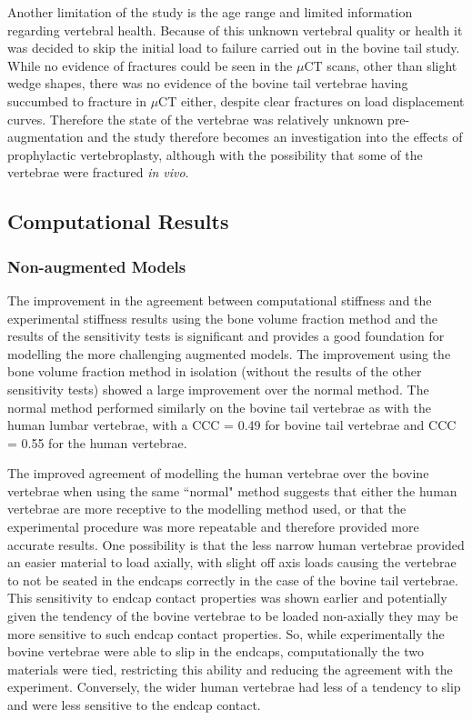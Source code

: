 Another limitation of the study is the age range and limited information
regarding vertebral health.  Because of this unknown vertebral quality or
health it was decided to skip the initial load to failure carried out in the
bovine tail study.  While no evidence of fractures could be seen in the $\mu$CT
scans, other than slight wedge shapes, there was no evidence of the bovine tail
vertebrae having succumbed to fracture in $\mu$CT either, despite clear
fractures on load displacement curves.  Therefore the state of the vertebrae
was relatively unknown pre-augmentation and the study therefore becomes an
investigation into the effects of prophylactic vertebroplasty, although with
the possibility that some of the vertebrae were fractured \textit{in vivo}.




\subsection{Computational Results}

\subsubsection{Non-augmented Models}

The improvement in the agreement between computational stiffness and the
experimental stiffness results using the bone volume fraction method and the
results of the sensitivity tests is significant and provides a good foundation
for modelling the more challenging augmented models. The improvement using the
bone volume fraction method in isolation (without the results of the other
sensitivity tests) showed a large improvement over the normal method.  The
normal method performed similarly on the bovine tail vertebrae as with the
human lumbar vertebrae, with a CCC = 0.49 for bovine tail vertebrae and CCC =
0.55 for the human vertebrae. 

The improved agreement of modelling the human vertebrae over the bovine
vertebrae when using the same ``normal" method suggests that either the human
vertebrae are more receptive to the modelling method used, or that the
experimental procedure was more repeatable and therefore provided more accurate
results. One possibility is that the less narrow human vertebrae provided an
easier material to load axially, with slight off axis loads causing the
vertebrae to not be seated in the endcaps correctly in the case of the bovine
tail vertebrae. This sensitivity to endcap contact properties was shown earlier
and potentially given the tendency of the bovine vertebrae to be loaded
non-axially they may be more sensitive to such endcap contact properties. So,
while experimentally the bovine vertebrae were able to slip in the endcaps,
computationally the two materials were tied, restricting this ability and
reducing the agreement with the experiment. Conversely, the wider human
vertebrae had less of a tendency to slip and were less sensitive to the endcap
contact.

